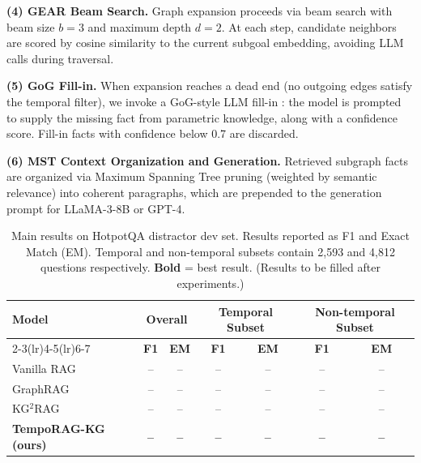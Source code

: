 \documentclass[11pt]{article}
\begin{document}
\textbf{(4) GEAR Beam Search.}
Graph expansion proceeds via beam search \cite{ma2025gear} with beam
size $b=3$ and maximum depth $d=2$. At each step, candidate neighbors
are scored by cosine similarity to the current subgoal embedding, avoiding
LLM calls during traversal.

\textbf{(5) GoG Fill-in.}
When expansion reaches a dead end (no outgoing edges satisfy the temporal
filter), we invoke a GoG-style LLM fill-in \cite{he2024gog}: the model is
prompted to supply the missing fact from parametric knowledge, along with
a confidence score. Fill-in facts with confidence below 0.7 are discarded.

\textbf{(6) MST Context Organization and Generation.}
Retrieved subgraph facts are organized via Maximum Spanning Tree pruning
(weighted by semantic relevance) into coherent paragraphs, which are
prepended to the generation prompt for LLaMA-3-8B or GPT-4.

\begin{table}[t]
  \centering
  \small
  \begin{tabular}{lcccccc}
    \toprule
    \multirow{2}{*}{\textbf{Model}} &
    \multicolumn{2}{c}{\textbf{Overall}} &
    \multicolumn{2}{c}{\textbf{Temporal Subset}} &
    \multicolumn{2}{c}{\textbf{Non-temporal Subset}} \\
    \cmidrule(lr){2-3}\cmidrule(lr){4-5}\cmidrule(lr){6-7}
    & \textbf{F1} & \textbf{EM} & \textbf{F1} & \textbf{EM} & \textbf{F1} & \textbf{EM} \\
    \midrule
    Vanilla RAG         & -- & -- & -- & -- & -- & -- \\
    GraphRAG            & -- & -- & -- & -- & -- & -- \\
    KG$^2$RAG           & -- & -- & -- & -- & -- & -- \\
    \midrule
    \textbf{TempoRAG-KG (ours)} & \textbf{--} & \textbf{--} & \textbf{--} & \textbf{--} & \textbf{--} & \textbf{--} \\
    \bottomrule
  \end{tabular}
  \caption{Main results on HotpotQA distractor dev set. Results reported
  as F1 and Exact Match (EM). Temporal and non-temporal subsets contain
  2,593 and 4,812 questions respectively. \textbf{Bold} = best result.
  (Results to be filled after experiments.)}
  \label{tab:main_results}
\end{table}
\end{document}
